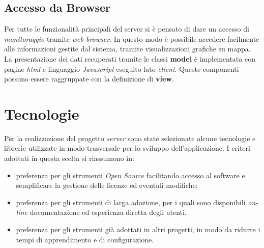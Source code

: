 \subsection{Accesso da Browser}
Per tutte le funzionalità principali del server si è pensato di dare un accesso di \emph{monitoraggio} tramite \emph{web browser}. In questo modo è possibile accedere facilmente alle informazioni gestite dal sistema, tramite visualizzazioni grafiche su mappa. La presentazione dei dati recuperati tramite le classi \textbf{model} è implementata con pagine \emph{html} e linguaggio \emph{Javascript} eseguito lato \emph{client}. Queste componenti possono essere raggruppate con la definizione di \textbf{view}.

\section{Tecnologie}
Per la realizzazione del progetto \emph{server} sono state selezionate alcune tecnologie e librerie utilizzate in modo trasversale per lo sviluppo dell'applicazione. I criteri adottati in questa scelta si riassumono in:
\begin{itemize}
\item preferenza per gli strumenti \emph{Open Source} facilitando accesso al software e semplificare la gestione delle licenze ed eventuli modifiche;
\item preferenza per gli strumenti di larga adozione, per i quali sono disponibili \emph{on-line} documentazione ed esperienza diretta degli utenti,
\item preferenza per gli strumenti già adottati in altri progetti, in modo da ridurre i tempi di apprendimento e di configurazione.
\end{itemize}


